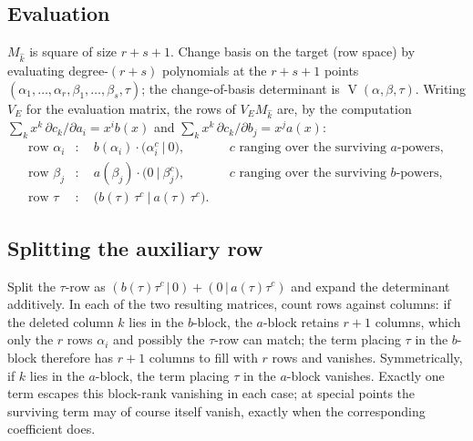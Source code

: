\documentclass[11pt,reqno]{amsart}
\theoremstyle{definition}
\theoremstyle{remark}
\newcommand{\Vand}{\operatorname{V}}
\begin{document}
\subsection{Evaluation}
$M_{\hat k}$ is square of size $r+s+1$.  Change basis on the target
(row space) by evaluating degree-$(r+s)$ polynomials at the
$r+s+1$ points $(\alpha_1,\dots,\alpha_r,\beta_1,\dots,\beta_s,\tau)$;
the change-of-basis determinant is
$\Vand(\alpha,\beta,\tau)$.  Writing $V_E$ for the evaluation matrix,
the rows of $V_EM_{\hat k}$ are, by the computation
$\sum_kx^k\,\partial c_k/\partial a_i=x^ib(x)$ and
$\sum_kx^k\,\partial c_k/\partial b_j=x^ja(x)$:
\begin{align*}
 \text{row }\alpha_i&:\quad
 b(\alpha_i)\cdot\bigl(\alpha_i^{c}\ \big|\ 0\bigr),
 &&c\text{ ranging over the surviving $a$-powers},\\
 \text{row }\beta_j&:\quad
 a(\beta_j)\cdot\bigl(0\ \big|\ \beta_j^{c}\bigr),
 &&c\text{ ranging over the surviving $b$-powers},\\
 \text{row }\tau&:\quad
 \bigl(b(\tau)\,\tau^{c}\ \big|\ a(\tau)\,\tau^{c}\bigr).
\end{align*}

\subsection{Splitting the auxiliary row}
Split the $\tau$-row as
$(b(\tau)\tau^{c}\,|\,0)+(0\,|\,a(\tau)\tau^{c})$ and expand the
determinant additively.  In each of the two resulting matrices, count
rows against columns: if the deleted column $k$ lies in the $b$-block,
the $a$-block retains $r+1$ columns, which only the $r$ rows
$\alpha_i$ and possibly the $\tau$-row can match; the term placing
$\tau$ in the $b$-block therefore has $r+1$ columns to fill with $r$
rows and vanishes.  Symmetrically, if $k$ lies in the $a$-block, the
term placing $\tau$ in the $a$-block vanishes.  Exactly one term
escapes this block-rank vanishing in each case; at special points the
surviving term may of course itself vanish, exactly when the
corresponding coefficient does.
\end{document}
